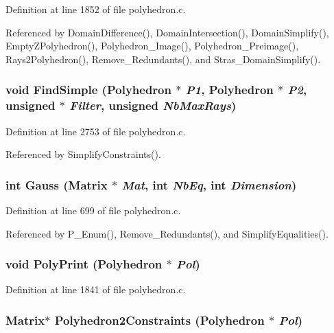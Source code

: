 Definition at line 1852 of file polyhedron.c.

Referenced by Domain\-Difference(), Domain\-Intersection(), Domain\-Simplify(), Empty\-ZPolyhedron(), Polyhedron\_\-Image(), Polyhedron\_\-Preimage(), Rays2Polyhedron(), Remove\_\-Redundants(), and Stras\_\-Domain\-Simplify().

\subsubsection{\setlength{\rightskip}{0pt plus 5cm}void Find\-Simple (Polyhedron $\ast$ {\em P1}, Polyhedron $\ast$ {\em P2}, unsigned $\ast$ {\em Filter}, unsigned {\em Nb\-Max\-Rays})\hspace{0.3cm}{\tt  [static]}}\label{polyhedron_8c_a39}




Definition at line 2753 of file polyhedron.c.

Referenced by Simplify\-Constraints().

\subsubsection{\setlength{\rightskip}{0pt plus 5cm}int Gauss (Matrix $\ast$ {\em Mat}, int {\em Nb\-Eq}, int {\em Dimension})}\label{polyhedron_8c_a15}




Definition at line 699 of file polyhedron.c.

Referenced by P\_\-Enum(), Remove\_\-Redundants(), and Simplify\-Equalities().

\subsubsection{\setlength{\rightskip}{0pt plus 5cm}void Poly\-Print (Polyhedron $\ast$ {\em Pol})}\label{polyhedron_8c_a21}




Definition at line 1841 of file polyhedron.c.
\subsubsection{\setlength{\rightskip}{0pt plus 5cm}Matrix$\ast$ Polyhedron2Constraints (Polyhedron $\ast$ {\em Pol})}\label{polyhedron_8c_a25}




